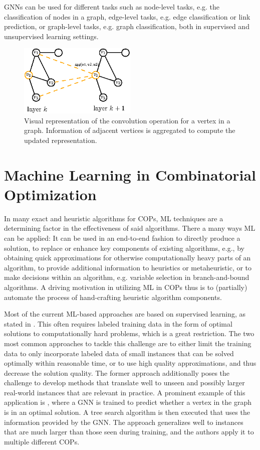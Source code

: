 \documentclass[draft,final]{vutinfth} %
\begin{document}
GNNs can be used for different tasks such as node-level tasks, e.g. the classification of nodes in a graph, edge-level tasks, e.g. edge classification or link prediction, or graph-level tasks, e.g. graph classification, both in supervised and unsupervised learning settings. 

\begin{figure}
    \centering
    \includegraphics[width=0.5\textwidth]{graphics/gnn-conv.eps}
    \caption{Visual representation of the convolution operation for a vertex in a graph. Information of adjacent vertices is aggregated to compute the updated representation.}
    \label{fig:conv-gnn}
\end{figure}

\section{Machine Learning in Combinatorial Optimization}\label{sec:ml-co}

In many exact and heuristic algorithms for COPs, ML techniques are a determining factor in the effectiveness of said algorithms. There a many ways ML can be applied: It can be used in an end-to-end fashion to directly produce a solution, to replace or enhance key components of existing algorithms, e.g., by obtaining quick approximations for otherwise computationally heavy parts of an algorithm, to provide additional information to heuristics or metaheuristic, or to make decisions within an algorithm, e.g. variable selection in branch-and-bound algorithms. A driving motivation in utilizing ML in COPs thus is to (partially) automate the process of hand-crafting heuristic algorithm components. 

Most of the current ML-based approaches are based on supervised learning, as stated in \cite{Cappart2021}. This often requires labeled training data in the form of optimal solutions to computationally hard problems, which is a great restriction. 
The two most common approaches to tackle this challenge are to either limit the training data to only incorporate labeled data of small instances that can be solved optimally within reasonable time, or to use high quality approximations, and thus decrease the solution quality. The former approach additionally poses the challenge to develop methods that translate well to unseen and possibly larger real-world instances that are relevant in practice. 
A prominent example of this application is \cite{Li2018}, where a GNN is trained to predict whether a vertex in the graph is in an optimal solution. A tree search algorithm is then executed that uses the information provided by the GNN. The approach generalizes well to instances that are much larger than those seen during training, and the authors apply it to multiple different COPs. 
\end{document}
